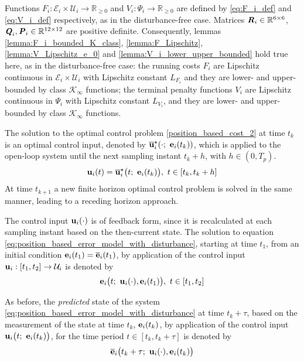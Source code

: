Functions
$F_i : \mathcal{E}_i \times \mathcal{U}_i \to \mathbb{R}_{\geq 0}$ and
$V_i: \Psi_i \to \mathbb{R}_{\geq 0}$ are defined by \eqref{eq:F_i_def}
and \eqref{eq:V_i_def} respectively, as in the disturbance-free case.
Matrices $\bm{\mathit{R}}_i \in \mathbb{R}^{6 \times 6}$,
$\bm{\mathit{Q}}_i, \bm{\mathit{P}}_i \in \mathbb{R}^{12 \times 12}$ are positive definite.
Consequently, lemmas \eqref{lemma:F_i_bounded_K_class},
\eqref{lemma:F_Lipschitz}, \eqref{lemma:V_Lipschitz_e_0} and
\eqref{lemma:V_i_lower_upper_bounded} hold true here, as in the
disturbance-free case: the running costs $F_i$ are Lipschitz continuous in
$\mathcal{E}_i \times \mathcal{U}_i$ with Lipschitz constant $L_{F_i}$ and
they are lower- and upper-bounded by class $\mathcal{K}_{\infty}$ functions;
the terminal penalty functions $V_i$ are Lipschitz continuous in $\Psi_i$
with Lipschitz constant $L_{V_i}$, and they are lower- and upper-bounded
by class $\mathcal{K}_{\infty}$ functions.


The solution to the optimal control problem \eqref{position_based_cost_2}
at time $t_k$ is an optimal control input, denoted by
$\overline{\bm{\mathbf{u}}}_i^{\star}(\cdot;\ \bm{\mathbf{e}}_i(t_k))$, which
is applied to the open-loop system until the next sampling instant $t_k + h$,
with $h \in (0,T_p)$.
\begin{align}
  \bm{\mathbf{u}}_i(t) = \overline{\bm{\mathbf{u}}}_i^{\star}\big(t;\ \bm{\mathbf{e}}_i(t_k)\big),\  t \in [t_k, t_k + h]
 \label{eq:position_based_optimal_u_2}
\end{align}
At time $t_{k+1}$ a new finite horizon optimal control problem is solved in the
same manner, leading to a receding horizon approach.

The control input $\bm{\mathbf{u}}_i(\cdot)$ is of feedback form,
since it is recalculated at each sampling instant based on the then-current
state. The solution to equation \eqref{eq:position_based_error_model_with_disturbance}, starting at time
$t_1$, from an initial condition $\bm{\mathbf{e}}_i(t_1) = \overline{\bm{\mathbf{e}}}_i(t_1)$,
by application of the control input $\bm{\mathbf{u}}_i : [t_1, t_2] \to \mathcal{U}_i$
is denoted by
\begin{align}
  \bm{\mathbf{e}}_i\big(t;\ \bm{\mathbf{u}}_i(\cdot), \bm{\mathbf{e}}_i(t_1)\big),\ t \in [t_1, t_2]
\end{align}

As before, the \textit{predicted} state of the system
\eqref{eq:position_based_error_model_with_disturbance}
at time $t_k + \tau$, based on the measurement of the state at time
$t_k$, $\bm{\mathbf{e}}_i(t_k)$, by application of the control input
$\bm{\mathbf{u}}_i\big(t;\ \bm{\mathbf{e}}_i(t_k)\big)$, for the time period $t \in [t_k, t_k + \tau]$
is denoted by
\begin{align}
  \overline{\bm{\mathbf{e}}}_i\big(t_k + \tau;\ \bm{\mathbf{u}}_i(\cdot), \bm{\mathbf{e}}_i(t_k)\big) \label{eq:position_based_predicted_error_0_2}
\end{align}

